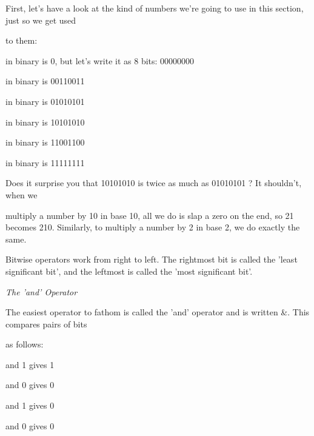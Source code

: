 \documentclass[a4paper,11pt]{book}
\begin{document}
\noindent 

\noindent First, let's have a look at the kind of numbers we're going to use in this section, just so we get used

\noindent to them:

\noindent 

 in binary is 0, but let's write it as 8 bits: 00000000

\noindent 

 in binary is 00110011

\noindent 

 in binary is 01010101

\noindent 

 in binary is 10101010

\noindent 

 in binary is 11001100

\noindent 

 in binary is 11111111

\noindent 

\noindent Does it surprise you that 10101010 is twice as much as 01010101 ? It shouldn't, when we

\noindent multiply a number by 10 in base 10, all we do is slap a zero on the end, so 21 becomes 210. Similarly, to multiply a number by 2 in base 2, we do exactly the same.

\noindent 

\noindent Bitwise operators work from right to left. The rightmost bit is called the 'least significant bit', and the leftmost is called the 'most significant bit'.

\noindent 

\noindent \textit{The 'and' Operator}

\noindent The easiest operator to fathom is called the 'and' operator and is written \&. This compares pairs of bits

\noindent as follows:

\noindent 

 and 1 gives 1

\noindent 

 and 0 gives 0

\noindent 

 and 1 gives 0

\noindent 

 and 0 gives 0

\noindent 
\end{document}
